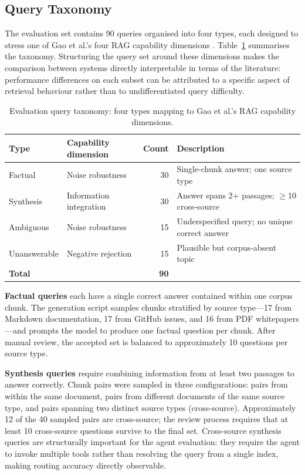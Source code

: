 \subsection{Query Taxonomy}

The evaluation set contains 90 queries organised into four types, each designed to stress one of Gao et al.'s four RAG capability dimensions \cite{gao2023ragsurvey}. Table~\ref{tab:query_taxonomy} summarises the taxonomy. Structuring the query set around these dimensions makes the comparison between systems directly interpretable in terms of the literature: performance differences on each subset can be attributed to a specific aspect of retrieval behaviour rather than to undifferentiated query difficulty.

\begin{table}[ht]
\centering
\small
\setlength{\tabcolsep}{4pt}
\caption{Evaluation query taxonomy: four types mapping to Gao et al.'s RAG capability dimensions.}
\label{tab:query_taxonomy}
\begin{tabular}{p{2.4cm}p{4.0cm}rp{6.0cm}}
\hline
\textbf{Type} & \textbf{Capability dimension} & \textbf{Count} & \textbf{Description} \\
\hline
Factual      & Noise robustness         & 30 & Single-chunk answer; one source type \\
Synthesis    & Information integration  & 30 & Answer spans 2+ passages; $\geq$10 cross-source \\
Ambiguous    & Noise robustness         & 15 & Underspecified query; no unique correct answer \\
Unanswerable & Negative rejection       & 15 & Plausible but corpus-absent topic \\
\hline
\textbf{Total} &                        & \textbf{90} & \\
\hline
\end{tabular}
\end{table}

\textbf{Factual queries} each have a single correct answer contained within one corpus chunk. The generation script samples chunks stratified by source type---17 from Markdown documentation, 17 from GitHub issues, and 16 from PDF whitepapers---and prompts the model to produce one factual question per chunk. After manual review, the accepted set is balanced to approximately 10 questions per source type.

\textbf{Synthesis queries} require combining information from at least two passages to answer correctly. Chunk pairs were sampled in three configurations: pairs from within the same document, pairs from different documents of the same source type, and pairs spanning two distinct source types (cross-source). Approximately 12 of the 40 sampled pairs are cross-source; the review process requires that at least 10 cross-source questions survive to the final set. Cross-source synthesis queries are structurally important for the agent evaluation: they require the agent to invoke multiple tools rather than resolving the query from a single index, making routing accuracy directly observable.

